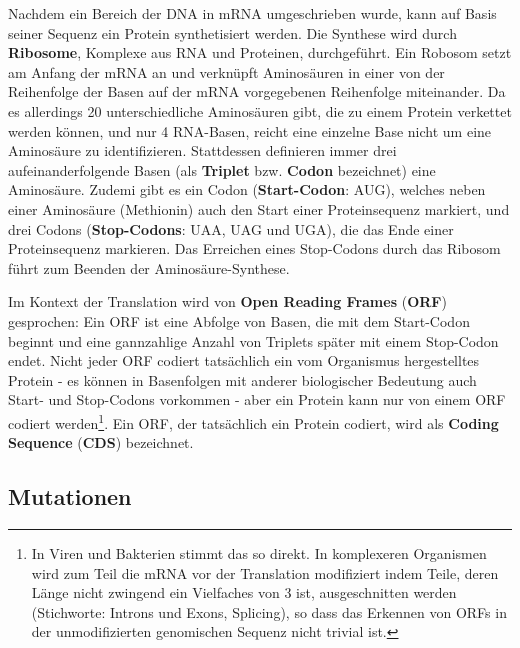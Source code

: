 Nachdem ein Bereich der DNA in mRNA umgeschrieben wurde, kann auf Basis seiner Sequenz ein Protein synthetisiert werden. Die Synthese wird durch \textbf{Ribosome}, Komplexe aus RNA und Proteinen, durchgeführt. Ein Robosom setzt am Anfang der mRNA an und verknüpft Aminosäuren in einer von der Reihenfolge der Basen auf der mRNA vorgegebenen Reihenfolge miteinander. Da es allerdings 20 unterschiedliche Aminosäuren gibt, die zu einem Protein verkettet werden können, und nur 4 RNA-Basen, reicht eine einzelne Base nicht um eine Aminosäure zu identifizieren. Stattdessen definieren immer drei aufeinanderfolgende Basen (als \textbf{Triplet} bzw. \textbf{Codon} bezeichnet) eine Aminosäure. Zudemi gibt es ein Codon (\textbf{Start-Codon}: AUG), welches neben einer Aminosäure (Methionin) auch den Start einer Proteinsequenz markiert, und drei Codons (\textbf{Stop-Codons}: UAA, UAG und UGA), die das Ende einer Proteinsequenz markieren. Das Erreichen eines Stop-Codons durch das Ribosom führt zum Beenden der Aminosäure-Synthese. 

Im Kontext der Translation wird von \textbf{Open Reading Frames} (\textbf{ORF}) gesprochen: Ein ORF ist eine Abfolge von Basen, die mit dem Start-Codon beginnt und eine gannzahlige Anzahl von Triplets später mit einem Stop-Codon endet. Nicht jeder ORF codiert tatsächlich ein vom Organismus hergestelltes Protein - es können in Basenfolgen mit anderer biologischer Bedeutung auch Start- und Stop-Codons vorkommen - aber ein Protein kann nur von einem ORF codiert werden\footnote{In Viren und Bakterien stimmt das so direkt. In komplexeren Organismen wird zum Teil die mRNA vor der Translation modifiziert indem Teile, deren Länge nicht zwingend ein Vielfaches von 3 ist, ausgeschnitten werden (Stichworte: Introns und Exons, Splicing), so dass das Erkennen von ORFs in der unmodifizierten genomischen Sequenz nicht trivial ist.}. Ein ORF, der tatsächlich ein Protein codiert, wird als \textbf{Coding Sequence} (\textbf{CDS}) bezeichnet. 

\subsection{Mutationen}

